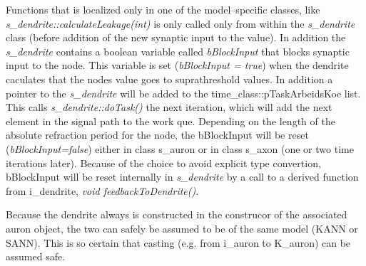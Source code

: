 


	Functions that is localized only in one of the model--specific classes, like \emph{s\_dendrite::calculateLeakage(int)} is only called only from within the \emph{s\_dendrite} class (before addition of the new synaptic input to the value).
	In addition the \emph{s\_dendrite} contains a boolean variable called \emph{bBlockInput} that blocks synaptic input to the node. 
	This variable is set (\emph{bBlockInput = true}) when the dendrite caculates that the nodes value goes to suprathreshold values. In addition a pointer to the \emph{s\_dendrite} will be added to the time\_class::pTaskArbeidsKoe list.
	This calls \emph{s\_dendrite::doTask()} the next iteration, which will add the next element in the signal path to the work que.
	Depending on the length of the absolute refraction period for the node, the bBlockInput will be reset (\emph{bBlockInput=false}) either in class s\_auron or in class s\_axon (one or two time iterations later).
	Because of the choice to avoid explicit type convertion, bBlockInput will be reset internally in \emph{s\_dendrite} by a call to a derived function from i\_dendrite, \emph{void feedbackToDendrite()}.


	Because the dendrite always is constructed in the construcor of the associated auron object, the two can safely be assumed to be %
		of the same model (KANN or SANN). %
	This is so certain that casting (e.g. from i\_auron to K\_auron) can be assumed safe.

